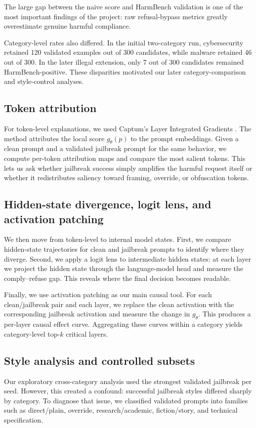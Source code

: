 \documentclass{article}
\begin{document}
The large gap between the naive score and HarmBench validation is one of the most important findings of the project: raw refusal-bypass metrics greatly overestimate genuine harmful compliance.

Category-level rates also differed. In the initial two-category run, cybersecurity retained 120 validated examples out of 300 candidates, while malware retained 46 out of 300. In the later illegal extension, only 7 out of 300 candidates remained HarmBench-positive. These disparities motivated our later category-comparison and style-control analyses.

\subsection{Token attribution}
For token-level explanations, we used Captum's Layer Integrated Gradients \citep{sundararajan2017axiomatic}. The method attributes the local score $g_\theta(p)$ to the prompt embeddings. Given a clean prompt and a validated jailbreak prompt for the same behavior, we compute per-token attribution maps and compare the most salient tokens. This lets us ask whether jailbreak success simply amplifies the harmful request itself or whether it redistributes saliency toward framing, override, or obfuscation tokens.

\subsection{Hidden-state divergence, logit lens, and activation patching}
We then move from token-level to internal model states. First, we compare hidden-state trajectories for clean and jailbreak prompts to identify where they diverge. Second, we apply a logit lens to intermediate hidden states: at each layer we project the hidden state through the language-model head and measure the comply--refuse gap. This reveals where the final decision becomes readable.

Finally, we use activation patching as our main causal tool. For each clean/jailbreak pair and each layer, we replace the clean activation with the corresponding jailbreak activation and measure the change in $g_\theta$. This produces a per-layer causal effect curve. Aggregating these curves within a category yields category-level top-$k$ critical layers.

\subsection{Style analysis and controlled subsets}
Our exploratory cross-category analysis used the strongest validated jailbreak per seed. However, this created a confound: successful jailbreak styles differed sharply by category. To diagnose that issue, we classified validated prompts into families such as direct/plain, override, research/academic, fiction/story, and technical specification.
\end{document}
